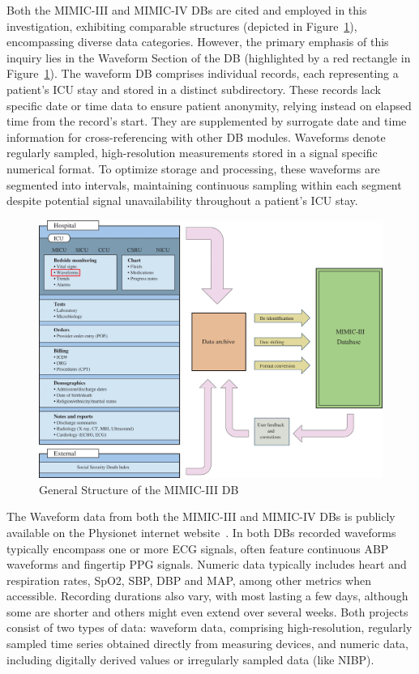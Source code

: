 Both the MIMIC-III and MIMIC-IV DBs are cited and employed in this investigation, exhibiting comparable structures (depicted in Figure~\ref{fig:mimic_structure}), encompassing diverse data categories.
However, the primary emphasis of this inquiry lies in the Waveform Section of the DB (highlighted by a red rectangle in Figure~\ref{fig:mimic_structure}).
The waveform DB comprises individual records, each representing a patient's ICU stay and stored in a distinct subdirectory.
These records lack specific date or time data to ensure patient anonymity, relying instead on elapsed time from the record's start.
They are supplemented by surrogate date and time information for cross-referencing with other DB modules.
Waveforms denote regularly sampled, high-resolution measurements stored in a signal specific numerical format.
To optimize storage and processing, these waveforms are segmented into intervals, maintaining continuous sampling within each segment despite potential signal unavailability throughout a patient's ICU stay.

\begin{figure}[h]
    \centering
    \includegraphics[scale=0.3]{images/mimic/mimic_structure}
    \caption{General Structure of the MIMIC-III DB~\cite{johnsonMIMICIIIFreelyAccessible2016}}
    \label{fig:mimic_structure}
\end{figure}

The Waveform data from both the MIMIC-III and MIMIC-IV DBs is publicly available on the Physionet internet website~\cite{moodyMIMICIIIWaveformDatabase2017, moodyMIMICIVWaveformDatabase}.
In both DBs recorded waveforms typically encompass one or more \ac{ECG} signals, often feature continuous ABP waveforms and fingertip PPG signals.
Numeric data typically includes heart and respiration rates, SpO2, SBP, DBP and MAP, among other metrics when accessible.
Recording durations also vary, with most lasting a few days, although some are shorter and others might even extend over several weeks.
Both projects consist of two types of data: waveform data, comprising high-resolution, regularly sampled time series obtained directly from measuring devices, and numeric data, including digitally derived values or irregularly sampled data (like NIBP).

